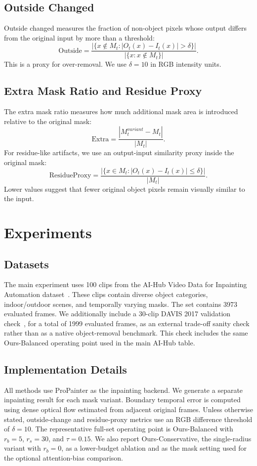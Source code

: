 \documentclass[nouppercase]{kaia}
\begin{document}
\subsection{Outside Changed}
Outside changed measures the fraction of non-object pixels whose output differs from the original input by more than a threshold:
\begin{equation}
    \text{Outside} =
    \frac{|\{x \notin M_t : |O_t(x)-I_t(x)| > \delta\}|}{|\{x : x \notin M_t\}|}.
\end{equation}
This is a proxy for over-removal. We use $\delta=10$ in RGB intensity units.

\subsection{Extra Mask Ratio and Residue Proxy}
The extra mask ratio measures how much additional mask area is introduced relative to the original mask:
\begin{equation}
    \text{Extra} = \frac{|M_t^{variant} - M_t|}{|M_t|}.
\end{equation}
For residue-like artifacts, we use an output-input similarity proxy inside the original mask:
\begin{equation}
    \text{ResidueProxy} =
    \frac{|\{x \in M_t : |O_t(x)-I_t(x)| \leq \delta\}|}{|M_t|}.
\end{equation}
Lower values suggest that fewer original object pixels remain visually similar to the input.

\section{Experiments}
\subsection{Datasets}
The main experiment uses 100 clips from the AI-Hub Video Data for Inpainting Automation dataset~\cite{aihub}. These clips contain diverse object categories, indoor/outdoor scenes, and temporally varying masks. The set contains 3973 evaluated frames. We additionally include a 30-clip DAVIS 2017 validation check~\cite{pont2017davis}, for a total of 1999 evaluated frames, as an external trade-off sanity check rather than as a native object-removal benchmark. This check includes the same Ours-Balanced operating point used in the main AI-Hub table.

\subsection{Implementation Details}
All methods use ProPainter as the inpainting backend. We generate a separate inpainting result for each mask variant. Boundary temporal error is computed using dense optical flow estimated from adjacent original frames. Unless otherwise stated, outside-change and residue-proxy metrics use an RGB difference threshold of $\delta=10$. The representative full-set operating point is Ours-Balanced with $r_b=5$, $r_s=30$, and $\tau=0.15$. We also report Ours-Conservative, the single-radius variant with $r_b=0$, as a lower-budget ablation and as the mask setting used for the optional attention-bias comparison.
\end{document}
